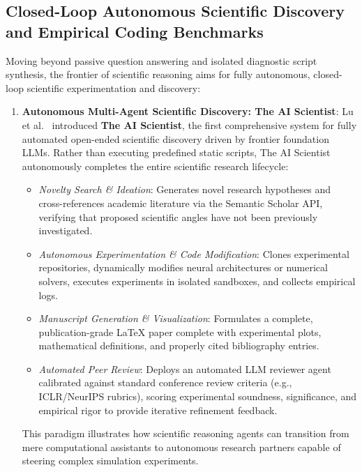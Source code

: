 \subsection{Closed-Loop Autonomous Scientific Discovery and Empirical Coding Benchmarks}
\label{sec:closed_loop_discovery}
Moving beyond passive question answering and isolated diagnostic script synthesis, the frontier of scientific reasoning aims for fully autonomous, closed-loop scientific experimentation and discovery:
\begin{enumerate}
    \item \textbf{Autonomous Multi-Agent Scientific Discovery: The AI Scientist}: Lu et al.~\cite{lu2024aiscientist} introduced \textbf{The AI Scientist}, the first comprehensive system for fully automated open-ended scientific discovery driven by frontier foundation LLMs. Rather than executing predefined static scripts, The AI Scientist autonomously completes the entire scientific research lifecycle:
    \begin{itemize}
        \item \textit{Novelty Search \& Ideation}: Generates novel research hypotheses and cross-references academic literature via the Semantic Scholar API, verifying that proposed scientific angles have not been previously investigated.
        \item \textit{Autonomous Experimentation \& Code Modification}: Clones experimental repositories, dynamically modifies neural architectures or numerical solvers, executes experiments in isolated sandboxes, and collects empirical logs.
        \item \textit{Manuscript Generation \& Visualization}: Formulates a complete, publication-grade LaTeX paper complete with experimental plots, mathematical definitions, and properly cited bibliography entries.
        \item \textit{Automated Peer Review}: Deploys an automated LLM reviewer agent calibrated against standard conference review criteria (e.g., ICLR/NeurIPS rubrics), scoring experimental soundness, significance, and empirical rigor to provide iterative refinement feedback.
    \end{itemize}
    This paradigm illustrates how scientific reasoning agents can transition from mere computational assistants to autonomous research partners capable of steering complex simulation experiments.

\end{enumerate}
